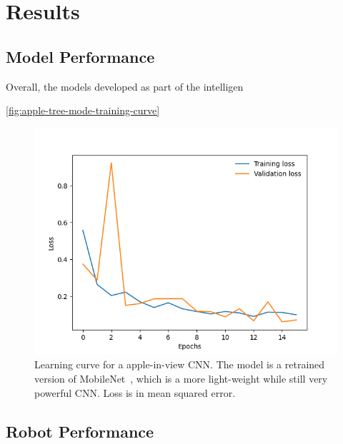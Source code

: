 \section{Results}
\subsection{Model Performance}\label{subsec:model-performance}
Overall, the models developed as part of the intelligen


\autoref{fig:apple-tree-mode-training-curve}
\begin{figure}[!htb]
    \centering
    \includegraphics[width=\columnwidth,keepaspectratio]
    {./figures/mobile_model_apple_trees_16its_2022-11-15_training_curve}
    \caption{
        Learning curve for a apple-in-view CNN.
        The model is a retrained version of MobileNet~\cite{Sandler2018,PyTorchMobileNet}, which is a more light-weight while still very powerful CNN.
        Loss is in mean squared error.
    }
    \label{fig:apple-tree-mode-training-curve}
\end{figure}




\subsection{Robot Performance}\label{subsec:robot-performance}


